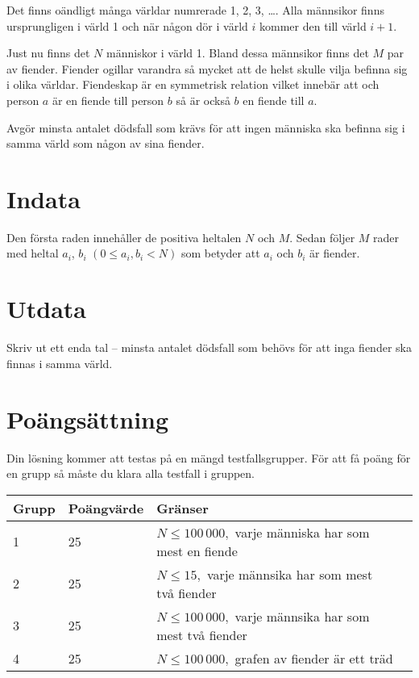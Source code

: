 \def\version{1}
Det finns oändligt många världar numrerade 1, 2, 3, \dots. Alla männsikor finns ursprungligen i värld 1 och när någon dör i värld $i$ kommer den till värld $i+1$.

Just nu finns det $N$ människor i värld 1. Bland dessa männsikor finns det $M$ par av fiender. Fiender ogillar varandra så mycket att de helst skulle vilja befinna sig i olika världar. Fiendeskap är en symmetrisk relation vilket innebär att och person $a$ är en fiende till person $b$ så är också $b$ en fiende till $a$.

Avgör minsta antalet dödsfall som krävs för att ingen människa ska befinna sig i samma värld som någon av sina fiender.

\section*{Indata}
Den första raden innehåller de positiva heltalen $N$ och $M$.
Sedan följer $M$ rader med heltal $a_i$, $b_i$ $(0 \le a_i, b_i < N)$ som betyder att $a_i$ och $b_i$ är fiender.

\section*{Utdata}
Skriv ut ett enda tal -- minsta antalet dödsfall som behövs för att inga fiender ska finnas i samma värld.

\section*{Poängsättning}
Din lösning kommer att testas på en mängd testfallsgrupper. För att få poäng för en grupp
så måste du klara alla testfall i gruppen.

\noindent
\begin{tabular}{| l | l | l | l |}
\hline
Grupp & Poängvärde & Gränser \\ \hline
	1     & 25 & $N \le 100\,000,$ varje människa har som mest en fiende \\ \hline
	2     & 25 & $N \le 15,$ varje männsika har som mest två fiender  \\ \hline
	3     & 25 & $N \le 100\,000,$ varje männsika har som mest två fiender  \\ \hline
	4     & 25 & $N \le 100\,000,$ grafen av fiender är ett träd \\ \hline
\end{tabular}
